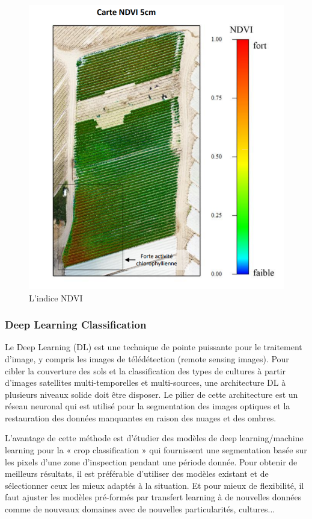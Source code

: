 \documentclass[12pt, openany]{report}
\begin{document}
\begin{figure}[H]
\centering
\includegraphics[scale=0.7]{ndvi.png}
\caption{L'indice NDVI}
\end{figure}



\subsubsection{Deep Learning Classification}
Le Deep Learning (DL) est une technique de pointe puissante pour le traitement d'image, y compris les images de télédétection (remote sensing images). 
Pour cibler la couverture des sols et la classification des types de cultures à partir d'images satellites multi-temporelles et multi-sources, une architecture DL à plusieurs niveaux solide doit être disposer. 
Le pilier de cette architecture est un réseau neuronal qui est utilisé pour la segmentation des images optiques et la restauration des données manquantes en raison des nuages et des ombres. \cite{deeplearning}

L’avantage de cette méthode est d’étudier des modèles de deep learning/machine learning pour la « crop classification » qui fournissent une segmentation basée sur les pixels d'une zone d'inspection pendant une période donnée. Pour obtenir de meilleurs résultats, il est préférable d’utiliser des modèles existant et de sélectionner ceux les mieux adaptés à la situation. Et pour mieux de flexibilité, il faut ajuster les modèles pré-formés par transfert learning à de nouvelles données comme de nouveaux domaines avec de nouvelles particularités, cultures...
\end{document}

